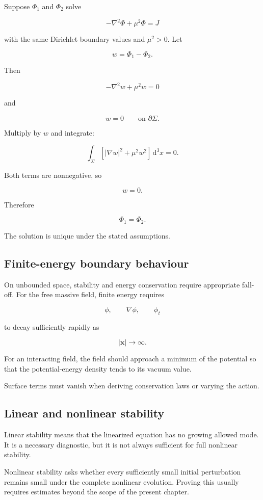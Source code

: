 Suppose \(\Phi_{1}\) and \(\Phi_{2}\) solve

\[
-\nabla^{2}\Phi
+
\mu^{2}\Phi
=
J
\]

with the same Dirichlet boundary values and \(\mu^{2}>0\). Let

\[
w=\Phi_{1}-\Phi_{2}.
\]

Then

\[
-\nabla^{2}w+\mu^{2}w=0
\]

and

\[
w=0
\qquad
\text{on }\partial\Sigma.
\]

Multiply by \(w\) and integrate:

\[
\int_{\Sigma}
\left[
|\nabla w|^{2}
+
\mu^{2}w^{2}
\right]
\,\mathrm{d}^{3}x
=0.
\]

Both terms are nonnegative, so

\[
w=0.
\]

Therefore

\[
\boxed{
\Phi_{1}=\Phi_{2}
}.
\]

The solution is unique under the stated assumptions.

\subsection{Finite-energy boundary behaviour}

On unbounded space, stability and energy conservation require appropriate fall-off. For the free massive field, finite energy requires

\[
\phi,
\qquad
\nabla\phi,
\qquad
\phi_{t}
\]

to decay sufficiently rapidly as

\[
|\mathbf{x}|\to\infty.
\]

For an interacting field, the field should approach a minimum of the potential so that the potential-energy density tends to its vacuum value.

Surface terms must vanish when deriving conservation laws or varying the action.

\subsection{Linear and nonlinear stability}

Linear stability means that the linearized equation has no growing allowed mode. It is a necessary diagnostic, but it is not always sufficient for full nonlinear stability.

Nonlinear stability asks whether every sufficiently small initial perturbation remains small under the complete nonlinear evolution. Proving this usually requires estimates beyond the scope of the present chapter.

